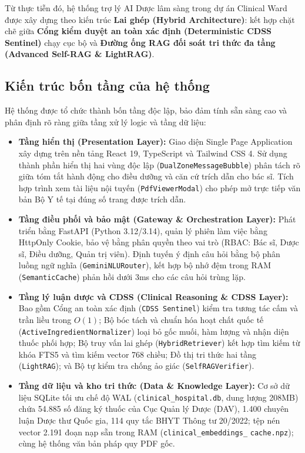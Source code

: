 \documentclass[12pt,a4paper]{article}
\begin{document}
Từ thực tiễn đó, hệ thống trợ lý AI Dược lâm sàng trong dự án Clinical Ward được xây dựng theo kiến trúc \textbf{Lai ghép (Hybrid Architecture)}: kết hợp chặt chẽ giữa \textbf{Cổng kiểm duyệt an toàn xác định (Deterministic CDSS Sentinel)} chạy cục bộ và \textbf{Đường ống RAG đối soát tri thức đa tầng (Advanced Self-RAG \& LightRAG)}.

\subsection{Kiến trúc bốn tầng của hệ thống}
Hệ thống được tổ chức thành bốn tầng độc lập, bảo đảm tính sẵn sàng cao và phân định rõ ràng giữa tầng xử lý logic và tầng dữ liệu:
\begin{itemize}[leftmargin=1.5em]
    \item \textbf{Tầng hiển thị (Presentation Layer):} Giao diện Single Page Application xây dựng trên nền tảng React 19, TypeScript và Tailwind CSS 4. Sử dụng thành phần hiển thị hai vùng độc lập (\texttt{DualZoneMessageBubble}) phân tách rõ giữa tóm tắt hành động cho điều dưỡng và căn cứ trích dẫn cho bác sĩ. Tích hợp trình xem tài liệu nội tuyến (\texttt{PdfViewerModal}) cho phép mở trực tiếp văn bản Bộ Y tế tại đúng số trang được trích dẫn.
    \item \textbf{Tầng điều phối và bảo mật (Gateway \& Orchestration Layer):} Phát triển bằng FastAPI (Python 3.12/3.14), quản lý phiên làm việc bằng HttpOnly Cookie, bảo vệ bằng phân quyền theo vai trò (RBAC: Bác sĩ, Dược sĩ, Điều dưỡng, Quản trị viên). Định tuyến ý định câu hỏi bằng bộ phân luồng ngữ nghĩa (\texttt{GeminiNLURouter}), kết hợp bộ nhớ đệm trong RAM (\texttt{SemanticCache}) phản hồi dưới 3ms cho các câu hỏi trùng lặp.
    \item \textbf{Tầng lý luận dược và CDSS (Clinical Reasoning \& CDSS Layer):} Bao gồm Cổng an toàn xác định (\texttt{CDSS Sentinel}) kiểm tra tương tác cấm và trần liều trong $O(1)$; Bộ bóc tách và chuẩn hóa hoạt chất quốc tế (\texttt{ActiveIngredientNormalizer}) loại bỏ gốc muối, hàm lượng và nhận diện thuốc phối hợp; Bộ truy vấn lai ghép (\texttt{HybridRetriever}) kết hợp tìm kiếm từ khóa FTS5 và tìm kiếm vector 768 chiều; Đồ thị tri thức hai tầng (\texttt{LightRAG}); và Bộ tự kiểm tra chống ảo giác (\texttt{SelfRAGVerifier}).
    \item \textbf{Tầng dữ liệu và kho tri thức (Data \& Knowledge Layer):} Cơ sở dữ liệu SQLite tối ưu chế độ WAL (\texttt{clinical\_hospital.db}, dung lượng 208MB) chứa 54.885 số đăng ký thuốc của Cục Quản lý Dược (DAV), 1.400 chuyên luận Dược thư Quốc gia, 114 quy tắc BHYT Thông tư 20/2022; tệp nén vector 2.191 đoạn nạp sẵn trong RAM (\texttt{clinical\_embeddings\_} \texttt{cache.npz}); cùng hệ thống văn bản pháp quy PDF gốc.
\end{itemize}
\end{document}
